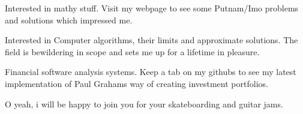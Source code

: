 

\begin{cventries}

  \cventryOnlyDescription
    {
      \begin{cvitems} %
        \item {Interested in mathy stuff. Visit my webpage to see some Putnam/Imo problems and solutions which impressed me.}
        \item {Interested in Computer algorithms, their limits and approximate solutions. The field is bewildering in scope and sets me up for a lifetime in pleasure.}
        \item {Financial software analysis systems. Keep a tab on my githubs to see my latest implementation of Paul Grahams way of creating investment portfolios.}
	\item {O yeah, i will be happy to join you for your skateboarding and guitar jams.}
      \end{cvitems}
    }

\end{cventries}
